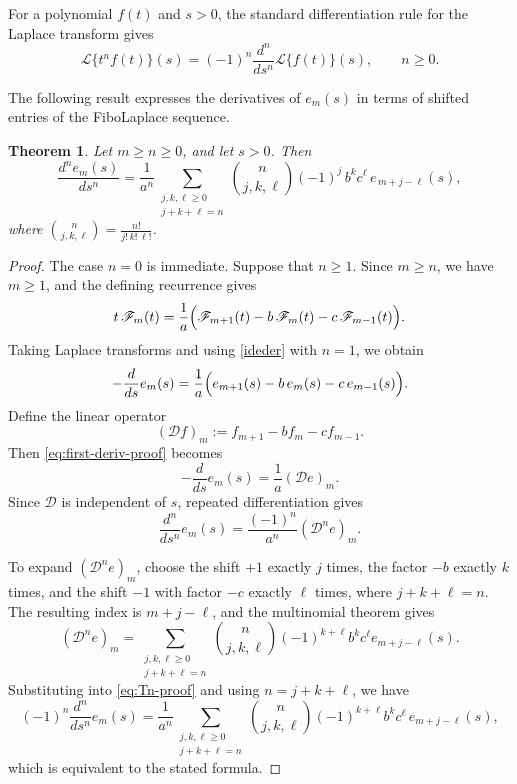 \documentclass[11pt]{amsart}
\newcommand{\Ft}[1]{\mathscr{F}_{#1}}
\theoremstyle{plain}
\numberwithin{equation}{section}
\newtheorem{theorem}[thm]{Theorem}
\begin{document}
For a polynomial $f(t)$ and $s>0$, the standard differentiation rule for the Laplace transform gives
\begin{equation}\label{ideder}
\mathcal{L}\{t^n f(t)\}(s)
=
(-1)^n\frac{d^n}{ds^n}\mathcal{L}\{f(t)\}(s),
\qquad n\geq 0.
\end{equation}

The following result expresses the derivatives of $e_m(s)$ in terms of shifted entries of the FiboLaplace sequence.

\begin{theorem}\label{teor:Derivativ}
Let $m\geq n \geq 0$, and let $s>0$. Then
\[
\frac{d^{n}e_{m}(s)}{ds^{n}}
=\frac{1}{a^n}\sum_{\substack{j,k,\ell\ge 0\\ j+k+\ell=n}}
\binom{n}{j,k,\ell}(-1)^{j}\, b^{k} c^{\ell}\, e_{\,m+j-\ell}(s),
\]
where $\binom{n}{j,k,\ell}=\frac{n!}{j!\,k!\,\ell!}$.
\end{theorem}


\begin{proof}
The case $n=0$ is immediate. Suppose that $n\geq 1$. Since $m\geq n$, we have $m\geq 1$, and the defining recurrence gives
\[
t\,\Ft{m}(t)
=
\frac{1}{a}
\Bigl(
\Ft{m+1}(t)-b\,\Ft{m}(t)-c\,\Ft{m-1}(t)
\Bigr).
\]
Taking Laplace transforms and using  \eqref{ideder} with $n=1$, we obtain 
\begin{equation}\label{eq:first-deriv-proof}
-\frac{d}{ds}e_m(s)=\frac1a\Bigl(e_{m+1}(s)-b\,e_m(s)-c\,e_{m-1}(s)\Bigr).
\end{equation}
Define the linear operator
\[
(\mathcal D f)_m:=f_{m+1}-b f_m-c f_{m-1}.
\]
Then \eqref{eq:first-deriv-proof} becomes
\[
-\frac{d}{ds}e_m(s)=\frac1a(\mathcal D e)_m.
\]
Since $\mathcal{D}$ is independent of $s$, repeated differentiation gives
\begin{equation}\label{eq:Tn-proof}
\frac{d^n}{ds^n}e_m(s)
=
\frac{(-1)^n}{a^n}
(\mathcal{D}^n e)_m.
\end{equation}

To expand $(\mathcal{D}^n e)_m$, choose the shift $+1$ exactly $j$ times, the factor $-b$ exactly $k$ times, and the shift $-1$ with factor $-c$ exactly $\ell$ times, where
$j+k+\ell=n$. The resulting index is $m+j-\ell$, and the multinomial theorem gives
\[
(\mathcal{D}^n e)_m
=
\sum_{\substack{j,k,\ell\geq 0\\j+k+\ell=n}}
\binom{n}{j,k,\ell}
(-1)^{k+\ell}b^k c^\ell
e_{m+j-\ell}(s).
\]
 Substituting into
\eqref{eq:Tn-proof} and using $n=j+k+\ell$, we have
\[
(-1)^n\frac{d^{n}}{ds^{n}}e_m(s)
=
\frac{1}{a^n}
\sum_{\substack{j,k,\ell\ge 0\\ j+k+\ell=n}}
\binom{n}{j,k,\ell}(-1)^{k+\ell}b^k c^\ell\,e_{m+j-\ell}(s),
\]
which is equivalent to the stated formula.
\end{proof}
\end{document}
